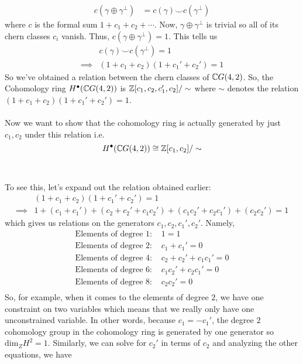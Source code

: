 \documentclass[11pt]{article}
\begin{document}
\begin{align*}
  c(\gamma \oplus \gamma^{\perp}) &= c(\gamma) \smile c(\gamma^{\perp})
\end{align*}
where $c$ is the formal sum $1 + c_1 + c_2 + \cdots$. Now, $\gamma \oplus \gamma^{\perp}$ is trivial so all of its chern classes $c_i$ vanish. Thus, $c(\gamma \oplus \gamma^{\perp}) = 1$. This tells us 
\begin{align*}
  &c(\gamma) \smile c(\gamma^{\perp}) = 1 \\
  \implies &(1 + c_1 + c_2)(1 + c_1' + c_2') = 1
\end{align*} So we've obtained a relation between the chern classes of $\mathbb{C} G(4,2)$. So, the Cohomology ring $H^{\bullet}(\mathbb{C} G(4,2))$ is $\mathbb{Z}[c_1, c_2, c_1', c_2]/ \sim $ where $\sim$ denotes the relation $(1+c_1+c_2)(1+c_1'+c_2') = 1$.
\\
\\
Now we want to show that the cohomology ring is actually generated by just $c_1, c_2$ under this relation i.e. $$ H^{\bullet}(\mathbb{C} G(4,2)) \cong \mathbb{Z}[c_1, c_2] /  \sim$$
\\
\\
To see this, let's expand out the relation obtained earlier:
\begin{align*}
  &(1 + c_1 + c_2)(1 + c_1' + c_2') = 1\\
  \implies &1 + (c_1 + c_1') + (c_2 + c_2' + c_1 c_2') + (c_1 c_2' + c_2 c_1') + (c_2 c_2') = 1
\end{align*} which gives us relations on the generators $c_1, c_2, c_1', c_2'$. Namely, 
\begin{align*}
  \text{Elements of degree 1: } & 1 = 1 \\
  \text{Elements of degree 2: } &c_1 + c_1' = 0 \\
  \text{Elements of degree 4: } &c_2 + c_2' + c_1c_1' = 0 \\
  \text{Elements of degree 6: } &c_1 c_2' + c_2 c_1' = 0 \\
  \text{Elements of degree 8: } &c_2 c_2' = 0 \\
\end{align*} So, for example, when it comes to the elements of degree $2$, we have one constraint on two variables which means that we really only have one unconstrained variable. In other words, because $c_1 = -c_1'$, the degree $2$ cohomology group in the cohomology ring is generated by one generator so $\mathrm{dim}_Z H^2 = 1$. Similarly, we can solve for $c_2'$ in terms of $c_2$ and analyzing the other equations, we have 
\end{document}
